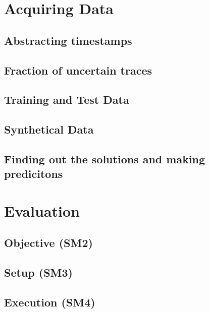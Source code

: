 \documentclass[
	a4paper,
	pagesize,
	pdftex,
	12pt,
	ngerman,
	fleqn,
	final,
	]{scrartcl}
\theoremstyle{plain}
\theoremstyle{definition}
\begin{document}
\section{Acquiring Data}
	
	\subsection{Abstracting timestamps}
	
	\subsection{Fraction of uncertain traces}
	
	\subsection{Training and Test Data}
	
	\subsection{Synthetical Data}
	
	\subsection{Finding out the solutions and making predicitons}

\section{Evaluation}

	\subsection{Objective (SM2)}
	
	\subsection{Setup (SM3)}
	
	\subsection{Execution (SM4)}
	
\end{document}
